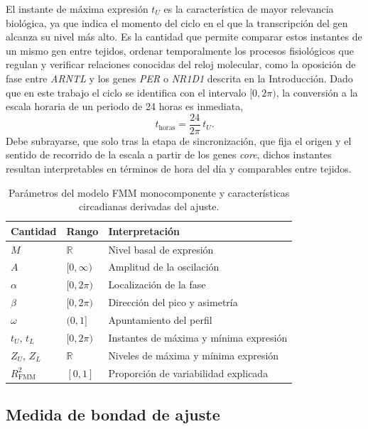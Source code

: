 \documentclass[12pt, a4paper]{report}
\begin{document}
El instante de máxima expresión \(t_U\) es la característica de mayor relevancia biológica, ya que indica el momento del ciclo en el que la transcripción del gen alcanza su nivel más alto. Es la cantidad que permite comparar estos instantes de un mismo gen entre tejidos, ordenar temporalmente los procesos fisiológicos que regulan y verificar relaciones conocidas del reloj molecular, como la oposición de fase entre \textit{ARNTL} y los genes \textit{PER} o \textit{NR1D1} descrita en la Introducción. Dado que en este trabajo el ciclo se identifica con el intervalo \([0,2\pi)\), la conversión a la escala horaria de un periodo de 24 horas es inmediata,
\[
t_{\mathrm{horas}}=\frac{24}{2\pi}\,t_{U} .
\]
Debe subrayarse, que solo tras la etapa de sincronización, que fija el origen y el sentido de recorrido de la escala a partir de los genes \textit{core}, dichos instantes resultan interpretables en términos de hora del día y comparables entre tejidos.

\begin{table}[H]
\centering
\begin{tabular}{lll}
\hline
Cantidad & Rango & Interpretación \\
\hline
\(M\)                & \(\mathbb{R}\)    & Nivel basal de expresión \\
\(A\)                & \([0,\infty)\)    & Amplitud de la oscilación \\
\(\alpha\)           & \([0,2\pi)\)      & Localización de la fase \\
\(\beta\)            & \([0,2\pi)\)      & Dirección del pico y asimetría \\
\(\omega\)           & \((0,1]\)         & Apuntamiento del perfil \\
\hline
\(t_{U}\), \(t_{L}\) & \([0,2\pi)\)      & Instantes de máxima y mínima expresión \\
\(Z_{U}\), \(Z_{L}\) & \(\mathbb{R}\)    & Niveles de máxima y mínima expresión \\
\(R^{2}_{\mathrm{FMM}}\) & \([0,1]\)     & Proporción de variabilidad explicada \\
\hline
\end{tabular}
\caption{Parámetros del modelo FMM monocomponente y características circadianas derivadas del ajuste.}
\label{tab:parametrosFMM}
\end{table}

\subsection{Medida de bondad de ajuste}
\label{sec:bondadAjuste}
\end{document}
